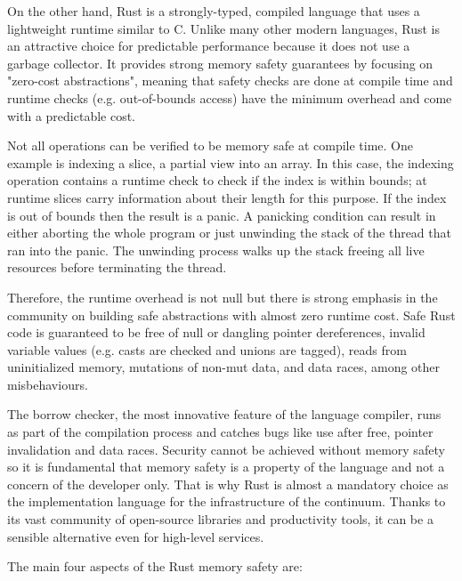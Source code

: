 \documentclass{ieeeaccess}
\begin{document}
On the other hand, Rust is a strongly-typed, compiled language that uses a lightweight runtime similar to C. Unlike many other modern languages, Rust is an attractive choice for predictable performance because it does not use a garbage collector. It provides strong memory safety guarantees by focusing on "zero-cost abstractions", meaning that safety checks are done at compile time and runtime checks (e.g. out-of-bounds access) have the minimum overhead and come with a predictable cost.

Not all operations can be verified to be memory safe at compile time. One example is indexing a slice, a partial view into an array. In this case, the indexing operation contains a runtime check to check if the index is within bounds; at runtime slices carry information about their length for this purpose. If the index is out of bounds then the result is a panic. A panicking condition can result in either aborting the whole program or just unwinding the stack of the thread that ran into the panic. The unwinding process walks up the stack freeing all live resources before terminating the thread.

Therefore, the runtime overhead is not null but there is strong emphasis in the community on building safe abstractions with almost zero runtime cost. Safe Rust code is guaranteed to be free of null or dangling pointer dereferences, invalid variable values (e.g. casts are checked and unions are tagged), reads from uninitialized memory, mutations of non-mut data, and data races, among other misbehaviours. 

The borrow checker, the most innovative feature of the language compiler, runs as part of the compilation process and catches bugs like use after free, pointer invalidation and data races. Security cannot be achieved without memory safety so it is fundamental that memory safety is a property of the language and not a concern of the developer only. That is why Rust is almost a mandatory choice as the implementation language for the infrastructure of the continuum. Thanks to its vast community of open-source libraries and productivity tools, it can be a sensible alternative even for high-level services.

The main four aspects of the Rust memory safety are:
\end{document}
